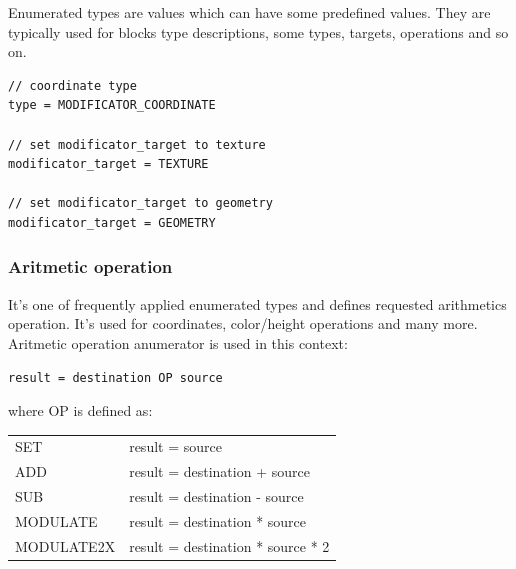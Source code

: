 \documentclass[9pt]{article}
\begin{document}
Enumerated types are values which can have some predefined values. 
They are typically used for blocks type descriptions, some types,
targets, operations and so on.
\begin{verbatim}
// coordinate type
type = MODIFICATOR_COORDINATE

// set modificator_target to texture
modificator_target = TEXTURE

// set modificator_target to geometry
modificator_target = GEOMETRY
\end{verbatim}

\subsubsection{Aritmetic operation}
It's one of frequently applied enumerated types and defines requested arithmetics
operation. It's used for coordinates, color/height operations and many more. Aritmetic 
operation anumerator is used in this context: 
\begin{verbatim}
result = destination OP source
\end{verbatim}
where OP is defined as: 
\begin{center}
\begin{tabular}{|l||l|}
SET & result = source\\
ADD & result = destination + source\\
SUB & result = destination - source\\
MODULATE & result = destination * source\\
MODULATE2X & result = destination * source * 2\\
\end{tabular}
\end{center}
\end{document}

